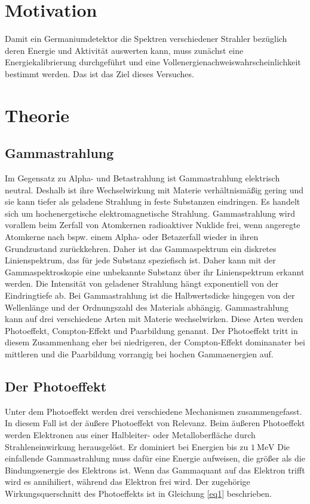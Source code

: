 \section{Motivation}
Damit ein Germaniumdetektor die Spektren verschiedener Strahler bezüglich deren
Energie und Aktivität auswerten kann, muss zunächst eine Energiekalibrierung 
durchgeführt und
eine Vollenergienachweiswahrscheinlichkeit bestimmt werden. 
Das ist das Ziel dieses Versuches.

\section{Theorie}
\label{sec:Theorie}

\subsection{Gammastrahlung}
Im Gegensatz zu Alpha- und Betastrahlung ist Gammastrahlung elektrisch neutral. 
Deshalb ist ihre Wechselwirkung mit Materie verhältnismäßig gering und sie 
kann tiefer als geladene Strahlung in feste Substanzen eindringen.
Es handelt sich um hochenergetische elektromagnetische Strahlung.
Gammastrahlung wird vorallem beim Zerfall von Atomkernen radioaktiver Nuklide frei, 
wenn angeregte Atomkerne nach bspw. einem Alpha- oder Betazerfall wieder in ihren 
Grundzustand zurückkehren.
Daher ist das Gammaspektrum ein diskretes Linienspektrum, das für jede Substanz 
speziefisch ist. Daher kann mit der Gammaspektroskopie eine unbekannte Substanz über 
ihr Linienspektrum erkannt werden.
Die Intensität von geladener Strahlung hängt exponentiell von der 
Eindringtiefe ab. Bei Gammastrahlung ist die Halbwertsdicke hingegen 
von der Wellenlänge und der Ordnungszahl des Materials abhängig.
Gammastrahlung kann auf drei verschiedene Arten mit Materie wechselwirken.
Diese Arten werden Photoeffekt, Compton-Effekt und Paarbildung genannt.
Der Photoeffekt tritt in diesem Zusammenhang eher bei niedrigeren, der 
Compton-Effekt dominanater bei mittleren und die Paarbildung vorrangig
bei hochen Gammaenergien auf.

\subsection{Der Photoeffekt}
Unter dem Photoeffekt werden drei verschiedene Mechanismen zusammengefasst.
In diesem Fall ist der äußere Photoeffekt von Relevanz.
Beim äußeren Photoeffekt werden Elektronen aus einer Halbleiter- oder Metalloberfläche 
durch Strahleneinwirkung herausgelöst. 
Er dominiert bei Energien bis zu $\SI{1}{\mega\eV}$
Die einfallende Gammastrahlung muss dafür eine Energie aufweisen, die größer als die 
Bindungsenergie des Elektrons ist. Wenn das Gammaquant auf das Elektron trifft wird es 
annihiliert, während das Elektron frei wird. Der zugehörige 
Wirkungsquerschnitt des Photoeffekts ist in Gleichung \ref{eq1} beschrieben.


